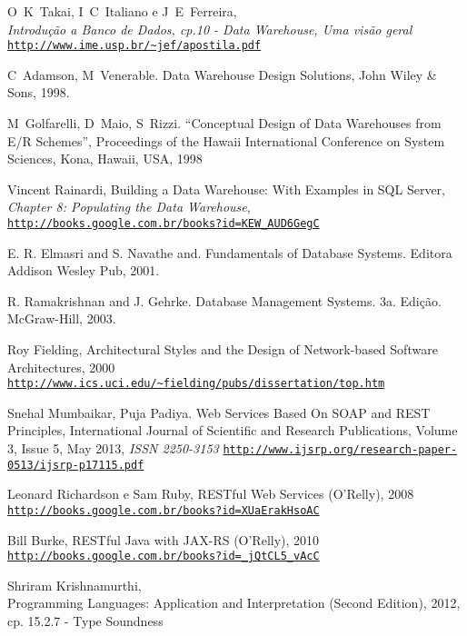 \begin{thebibliography}{99}
O~K~Takai, I~C~Italiano e J~E~Ferreira,\\
  \mbox{}\hfill \textsl{Introdução a Banco de Dados, cp.10 - Data Warehouse, Uma visão geral}\\
  \mbox{}\hfill\texttt{\url{http://www.ime.usp.br/~jef/apostila.pdf}}

 C~Adamson, M~Venerable. Data Warehouse Design Solutions, John Wiley \& Sons, 1998.

 M~Golfarelli, D~Maio, S~Rizzi. “Conceptual Design of Data Warehouses from E/R
 Schemes”, Proceedings of the Hawaii International Conference on System Sciences,
  Kona, Hawaii, USA, 1998  

Vincent Rainardi, Building a Data Warehouse: With Examples in SQL Server, \textsl{Chapter 8: Populating the Data Warehouse},
\\ 
\mbox{}\hfill\texttt{\url{http://books.google.com.br/books?id=KEW\_AUD6GegC}}

 E. R. Elmasri and S. Navathe and. Fundamentals of Database Systems. Editora
Addison Wesley Pub, 2001.

 R. Ramakrishnan and J. Gehrke. Database Management Systems. 3a. Edição.
 McGraw-Hill, 2003.

Roy Fielding, Architectural Styles and the Design of Network-based Software Architectures, 2000
\\ 
\mbox{}\hfill\small{\texttt{\url{http://www.ics.uci.edu/~fielding/pubs/dissertation/top.htm}}}
\normalsize{}

Snehal Mumbaikar, Puja Padiya. Web Services Based On SOAP and REST Principles, 
International Journal of Scientific and Research Publications, Volume 3, Issue 5, May 2013,
\textsl{ISSN 2250-3153}
\mbox{}\hfill\texttt{\url{http://www.ijsrp.org/research-paper-0513/ijsrp-p17115.pdf}}

Leonard Richardson e Sam Ruby, RESTful Web Services (O'Relly), 2008
\\ 
\mbox{}\hfill\texttt{\url{http://books.google.com.br/books?id=XUaErakHsoAC}}

Bill Burke, RESTful Java with JAX-RS (O'Relly), 2010
\\ 
\mbox{}\hfill\texttt{\url{http://books.google.com.br/books?id=\_jQtCL5\_vAcC}}

 Shriram Krishnamurthi,\\ Programming Languages: Application and Interpretation (Second Edition), 2012, cp. 15.2.7 - Type Soundness


\end{thebibliography}
